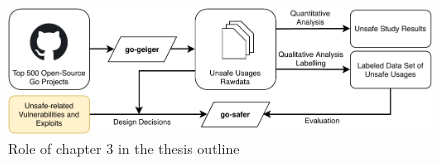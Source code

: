 \begin{figure}[htp!]
    \includegraphics[width=\textwidth]{assets/figures/chapter3/outline3.pdf}
    \caption{Role of chapter 3 in the thesis outline}
    \label{fig:outline3}
\end{figure}
